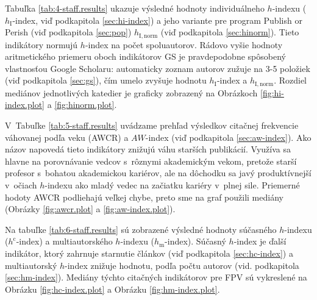 Tabuľka \ref{tab:4-staff.results} ukazuje výsledné hodnoty individuálneho
$h$-indexu ($h_{\mathrm{I}}$-index, viď podkapitola \ref{sec:hi-index}) a jeho
variante pre program Publish or Perish (viď podkapitola \ref{sec:pop})
$h_{\mathrm{I,norm}}$ (viď podkapitola \ref{sec:hinorm}). Tieto indikátory
normujú $h$-index na počet spoluautorov. Rádovo vyšie hodnoty aritmetického
priemeru oboch indikátorov GS je pravdepodobne spôsobený vlastnosťou Google Scholaru:
automaticky zoznam autorov zužuje na 3-5 položiek (viď podkapitola \ref{sec:gs}),
čím umelo zvyšuje hodnotu $h_{\mathrm{I}}$-index a $h_{\mathrm{I,norm}}$.
Rozdiel mediánov jednotlivých katedier je graficky zobrazený na Obrázkoch \ref{fig:hi-index.plot} a
\ref{fig:hinorm.plot}.

V~Tabuľke \ref{tab:5-staff.results} uvádzame prehľad výsledkov citačnej frekvencie váhovanej
podľa veku (AWCR) a $AW$-index (viď podkapitola \ref{sec:aw-index}). Ako názov napovedá
tieto indikátory znižujú váhu starších publikácií. Využíva sa hlavne na porovnávanie
vedcov s~rôznymi akademickým vekom, pretože starší profesor s~bohatou akademickou kariérov, ale
na dôchodku sa javý produktívnejší v~očiach $h$-indexu ako mladý vedec na začiatku kariéry
v~plnej sile. Priemerné hodoty AWCR podliehajú veľkej chybe, preto sme na graf použili
mediány (Obrázky \ref{fig:awcr.plot} a \ref{fig:aw-index.plot}).

Na tabuľke \ref{tab:6-staff.results} sú zobrazené výsledné hodnoty súčasného $h$-indexu
($h^{\mathrm{c}}$-index) a multiautorského $h$-indexu ($h_{\mathrm{m}}$-index).
Súčasný $h$-index je ďalší indikátor, ktorý zahrnuje starnutie článkov (viď podkapitola \ref{sec:hc-index}) a
multiautorský $h$-index znižuje hodnotu, podľa počtu autorov (vid. podkapitola \ref{sec:hm-index}).
Mediány týchto citačných indikátorov pre FPV sú vykreslené na Obrázku \ref{fig:hc-index.plot} a Obrázku \ref{fig:hm-index.plot}.

